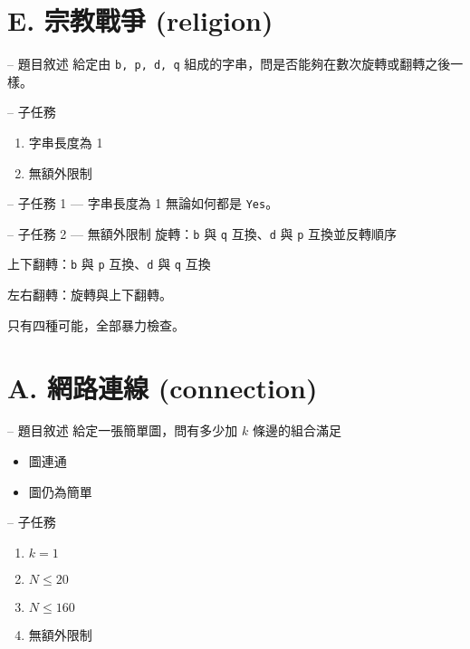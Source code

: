 \documentclass[hyperref,UTF8,notheorems,xcolor={dvipsnames}]{beamer}
\newcommand{\btitle}[1]{{\secname} -- #1}
\theoremstyle{definition}
\begin{document}
\section{E. 宗教戰爭 (religion)}

\begin{frame}[fragile]{\btitle{題目敘述}}
	給定由 \texttt{b, p, d, q} 組成的字串，問是否能夠在數次旋轉或翻轉之後一樣。  
\end{frame}

\begin{frame}[fragile]{\btitle{子任務}}
	\begin{enumerate}
		\item 字串長度為 1
		\item 無額外限制
	\end{enumerate}
\end{frame}

\begin{frame}[fragile]{\btitle{子任務 1 --- 字串長度為 1}}
	無論如何都是 \texttt{Yes}。
\end{frame}

\begin{frame}[fragile]{\btitle{子任務 2 --- 無額外限制}}
	旋轉：\texttt{b} 與 \texttt{q} 互換、\texttt{d} 與 \texttt{p} 互換並反轉順序

	上下翻轉：\texttt{b} 與 \texttt{p} 互換、\texttt{d} 與 \texttt{q} 互換
	
	左右翻轉：旋轉與上下翻轉。  

	只有四種可能，全部暴力檢查。  
\end{frame}

\section{A. 網路連線 (connection)}

\begin{frame}[fragile]{\btitle{題目敘述}}
	給定一張簡單圖，問有多少加 $k$ 條邊的組合滿足

	\begin{itemize}
		\item 圖連通
		\item 圖仍為簡單
	\end{itemize}
\end{frame}

\begin{frame}[fragile]{\btitle{子任務}}
	\begin{enumerate}
		\item $k = 1$
		\item $N \leq 20$
		\item $N \leq 160$
		\item 無額外限制
	\end{enumerate}
\end{frame}
\end{document}
